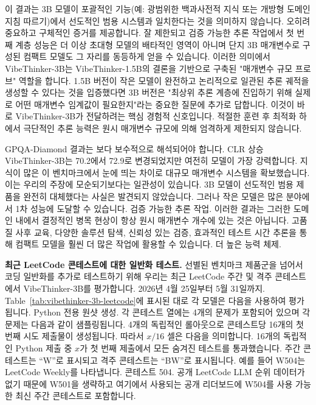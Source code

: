 \documentclass{article}
\begin{document}
이 결과는 3B 모델이 포괄적인 기능(예: 광범위한 백과사전적 지식 또는 개방형 도메인 지침 따르기)에서 선도적인 범용 시스템과 일치한다는 것을 의미하지 않습니다. 오히려 중요하고 구체적인 증거를 제공합니다. 잘 제한되고 검증 가능한 추론 작업에서 첫 번째 계층 성능은 더 이상 초대형 모델의 배타적인 영역이 아니며 단지 3B 매개변수로 구성된 컴팩트 모델도 그 자리를 동등하게 얻을 수 있습니다. 이러한 의미에서 VibeThinker-3B는 VibeThinker-1.5B의 결론을 기반으로 구축된 "매개변수 규모 프로브" 역할을 합니다. 1.5B 버전이 작은 모델이 완전하고 논리적으로 일관된 추론 궤적을 생성할 수 있다는 것을 입증했다면 3B 버전은 "최상위 추론 계층에 진입하기 위해 실제로 어떤 매개변수 임계값이 필요한지"라는 중요한 질문에 추가로 답합니다. 이것이 바로 VibeThinker-3B가 전달하려는 핵심 경험적 신호입니다. 적절한 훈련 후 최적화 하에서 극단적인 추론 능력은 원시 매개변수 규모에 의해 엄격하게 제한되지 않습니다.

GPQA-Diamond 결과는 보다 보수적으로 해석되어야 합니다. CLR 상승
VibeThinker-3B는 70.2에서 72.9로 변경되었지만 여전히 모델이 가장 강력합니다.
지식이 많은 이 벤치마크에서 눈에 띄는 차이로 대규모 매개변수 시스템을 확보했습니다.
이는 우리의 주장에 모순되기보다는 일관성이 있습니다.
3B 모델이 선도적인 범용 제품을 완전히 대체했다는 사실은 발견되지 않았습니다.
그러나 작은 모델은 많은 분야에서 1차 성능에 도달할 수 있습니다.
검증 가능한 추론 작업. 이러한 결과는 그러한 도메인 내에서
결정적인 병목 현상이 항상 원시 매개변수 개수에 있는 것은 아닙니다. 고품질
사후 교육, 다양한 솔루션 탐색, 신뢰성 있는 검증,
효과적인 테스트 시간 추론을 통해 컴팩트 모델을 훨씬 더 많은 작업에 활용할 수 있습니다.
더 높은 능력 체제.



\textbf{최근 LeetCode 콘테스트에 대한 일반화 테스트.}
선별된 벤치마크 제품군을 넘어서 코딩 일반화를 추가로 테스트하기 위해 우리는
최근 LeetCode 주간 및 격주 콘테스트에서 VibeThinker-3B를 평가합니다.
2026년 4월 25일부터 5월 31일까지. Table~\ref{tab:vibethinker-3b-leetcode}에 표시된 대로 각 모델은 다음을 사용하여 평가됩니다.
Python 전용 원샷 생성. 각 콘테스트 열에는 4개의 문제가 포함되어 있으며 각 문제는 다음과 같이 샘플링됩니다.
4개의 독립적인 롤아웃으로 콘테스트당 16개의 첫 번째 시도 제출물이 생성됩니다. 따라서 $x/16$ 셀은 다음을 의미합니다.
16개의 독립적인 Python 제출 중 $x$가 첫 번째 제출에서 모든 숨겨진 테스트를 통과했습니다. 주간
콘테스트는 ``W''로 표시되고 격주 콘테스트는 ``BW''로 표시됩니다. 예를 들어 W504는 LeetCode Weekly를 나타냅니다.
콘테스트 504. 공개 LeetCode LLM 순위 데이터가 없기 때문에 W501을 생략하고 여기에서 사용되는 공개 리더보드에 W504를 사용 가능한 최신 주간 콘테스트로 포함합니다.
\end{document}
